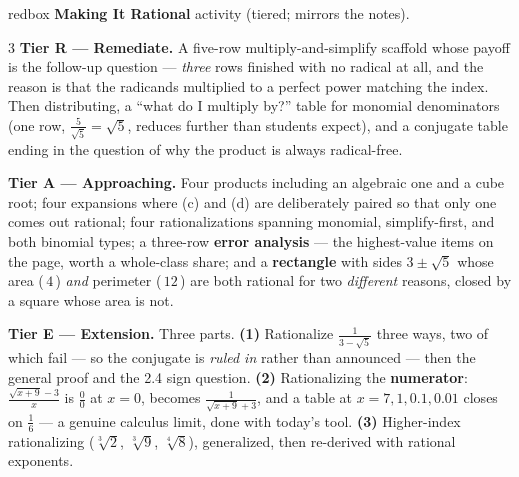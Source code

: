 \documentclass[10pt]{article}
\begin{document}
\begin{skillbox}{redbox}
\textbf{Making It Rational} activity (tiered; mirrors the notes).
\begin{multicols}{3}
\textbf{Tier R --- Remediate.} A five-row multiply-and-simplify scaffold whose payoff is the
follow-up question --- \emph{three} rows finished with no radical at all, and the reason is that the
radicands multiplied to a perfect power matching the index. Then distributing, a
``what do I multiply by?'' table for monomial denominators (one row, $\frac{5}{\sqrt5}=\sqrt5$,
reduces further than students expect), and a conjugate table ending in the question of why the
product is always radical-free.

\columnbreak
\textbf{Tier A --- Approaching.} Four products including an algebraic one and a cube root; four
expansions where (c) and (d) are deliberately paired so that only one comes out rational; four
rationalizations spanning monomial, simplify-first, and both binomial types; a three-row
\textbf{error analysis} --- the highest-value items on the page, worth a whole-class share; and a
\textbf{rectangle} with sides $3\pm\sqrt5$ whose area (\,$4$\,) \emph{and} perimeter (\,$12$\,) are
both rational for two \emph{different} reasons, closed by a square whose area is not.

\columnbreak
\textbf{Tier E --- Extension.} Three parts. \textbf{(1)} Rationalize $\frac{1}{3-\sqrt5}$ three
ways, two of which fail --- so the conjugate is \emph{ruled in} rather than announced --- then the
general proof and the 2.4 sign question. \textbf{(2)} Rationalizing the \textbf{numerator}:
$\frac{\sqrt{x+9}-3}{x}$ is $\frac00$ at $x=0$, becomes $\frac{1}{\sqrt{x+9}+3}$, and a table at
$x=7,1,0.1,0.01$ closes on $\frac16$ --- a genuine calculus limit, done with today's tool.
\textbf{(3)} Higher-index rationalizing ($\sqrt[3]2$, $\sqrt[3]9$, $\sqrt[4]8$), generalized, then
re-derived with rational exponents.
\end{multicols}
\end{skillbox}
\end{document}
